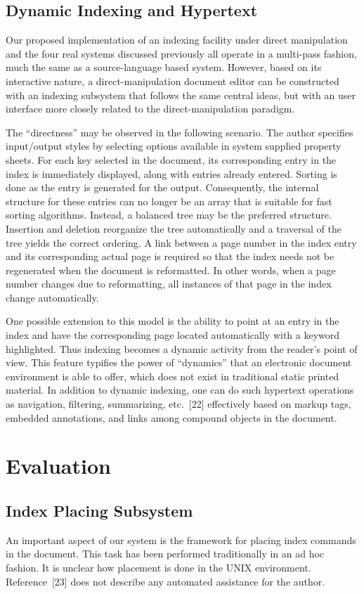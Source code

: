 \subsection{Dynamic Indexing and Hypertext}
Our proposed implementation of an indexing facility under direct manipulation
and the four real systems discussed previously all operate
in a multi-pass fashion, much the same as a source-language based system.
However, based on its interactive nature, a direct-manipulation document
editor can be constructed with an indexing subsystem that follows the same
central ideas, but with an user interface more closely related to the
direct-manipulation paradigm.

The ``directness'' may be observed in the following scenario.
The author specifies input/output styles by selecting options available
in system supplied property sheets.  For each key selected
in the document, its corresponding entry in the index is immediately
displayed, along with entries already entered.
Sorting is done as the entry is generated for the output.
Consequently, the internal structure for these entries can no longer be
an array that is suitable for fast sorting algorithms.
Instead, a balanced tree may be the preferred structure.
Insertion and deletion reorganize the tree automatically and
a traversal of the tree yields the correct ordering.
A link between a page number in the index entry and its corresponding
actual page is required so that the index needs not be regenerated
when the document is reformatted.  In other words, when a page
number changes due to reformatting, all instances of that page in the index
change automatically.  

One possible extension to this model is the ability to point at an entry
in the index and
have the corresponding page located automatically with a keyword highlighted.
Thus indexing becomes a dynamic activity from the reader's point of view.
This feature typifies the power of ``dynamics'' that an electronic document
environment is able to offer, which does not exist in traditional
static printed material.  In addition to dynamic indexing,
one can do such hypertext operations as navigation, filtering, summarizing,
etc.~[22] effectively based on markup tags, embedded annotations, and
links among compound objects in the document.


\section{Evaluation}
\subsection{Index Placing Subsystem}
An important aspect of our system is the framework for
placing index commands in the document.
This task has been performed traditionally in an ad hoc fashion.
It is unclear how placement is done in the 
UNIX {\TF} environment.  Reference~[23] does not describe
any automated assistance for the author.

